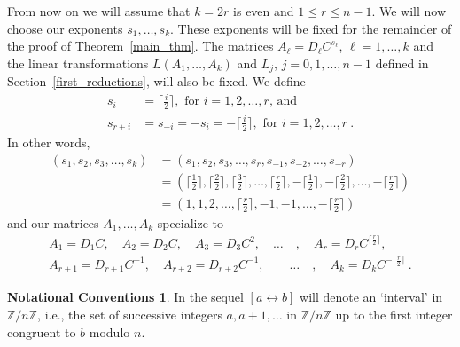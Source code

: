 \documentclass{amsproc}
\theoremstyle{definition}
\newtheorem{nc}[theorem]{Notational Conventions}
\theoremstyle{remark}
\numberwithin{equation}{section}
\newcommand{\Z}{{\mathbb Z}}
\newcommand{\interval}{\longleftrightarrow}
\begin{document}
 From now on we will assume that $k = 2r$ is even and $1 \leqslant r \leqslant n-1$.
We will now choose our exponents $s_1,\dots,s_k$. These exponents will be fixed for 
the remainder of the proof of Theorem~\ref{main_thm}. 
The matrices $A_\ell=D_\ell C^{s_\ell}$, $\ell = 1, \ldots, k$ and the linear transformations 
$L(A_1,\dots,A_k)$ and $L_j$, $j = 0, 1, \ldots, n-1$ defined in Section~\ref{first_reductions}, will also be fixed.
We define
\begin{align*}
s_i&=\lceil \frac i 2 \rceil, \text{ for $i=1,2,\dots,r$, and}\\
s_{r+i}&=s_{-i}=-s_i=-\lceil \frac i 2 \rceil, \text{ for $i=1,2,\dots,r$}\ .
\end{align*}
In other words,
\begin{align*}
(s_1,s_2,s_3,\dots,s_k)&=(s_1,s_2,s_3,\dots,s_r,s_{-1},s_{-2},\dots,s_{-r})\\
&=\left(\lceil \frac {1} {2} \rceil,\lceil \frac {2} {2} \rceil,\lceil \frac {3} {2} \rceil,\dots,\lceil \frac {r} {2} \rceil,-\lceil \frac {1} {2} \rceil,-\lceil \frac {2} {2} \rceil,\dots,-\lceil \frac {r} {2} \rceil\right)\\
&=(1,1,2,\dots,\lceil\frac r 2 \rceil,-1,-1,\dots,-\lceil \frac r 2 \rceil)
\end{align*}
and our matrices $A_1, \ldots, A_k$ specialize to
\begin{gather*} A_1=D_1C,\quad A_2=D_2C, \quad A_3=D_3C^2, \quad \ldots \quad , \quad  
A_r=D_rC^{\lceil \frac r 2\rceil}, \\
A_{r+1}=D_{r+1}C^{-1}, \quad  A_{r+2} = D_{r + 2} C^{-1}, \quad \quad \dots \quad ,   \quad A_k=D_kC^{-\lceil \frac r 2 \rceil}\ .\end{gather*}

\begin{nc} In the sequel
$[a\interval b]$ will denote an `interval' in $\Z/n\Z$, i.e., the set of successive integers $a,a+1,\dots$ in $\Z/n\Z$ up to the first integer congruent to $b$ modulo $n$.
\end{nc}
\end{document}
